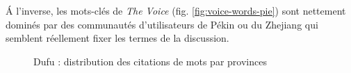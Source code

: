 \'A l{\textquoteright}inverse, les mots-clés de \textit{The Voice} (fig. \ref{fig:voice-words-pie}) sont nettement dominés par des communautés d{\textquoteright}utilisateurs de Pékin ou du Zhejiang qui semblent réellement fixer les termes de la discussion.


\begin{figure}[h!]
    \centering
    \newline
    \caption{
      Dufu : distribution des citations de mots par provinces 
    }
    \label{fig:dufu-words-pie}
\end{figure}

